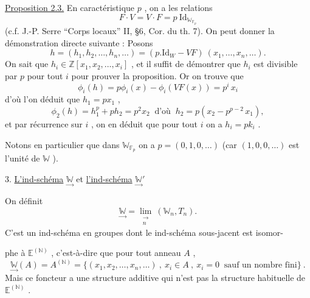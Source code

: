\documentclass[11pt]{article}
\newcommand{\scanpage}[1]{\par\bigskip\noindent{\small\sffamily[scan #1]}\par}
\newcommand{\mspage}[1]{{\small\sffamily[p.\,#1]}}
\newcommand{\uline}[1]{\underline{#1}}
\begin{document}
\clearpage
\scanpage{129/19}
\uline{Proposition 2.3.} En caractéristique $p$ , on a les relations
\[ F\cdot V = V\cdot F = p\ \mathrm{Id}_{\mathbb{W}_{\mathbb{F}_p}} \]
(c.f. J.-P. Serre ``Corps locaux'' II, §6, Cor. du th. 7). On peut donner
la démonstration directe suivante : Posons
\[ h = (h_1,h_2,\dots,h_n,\dots) = (p.\mathrm{Id}_W - VF)\ (x_1,\dots,x_n,\dots) . \]
On sait que $h_i \in \mathbb{Z}[x_1,x_2,\dots,x_i]$ , et il suffit de démontrer que $h_i$
est divisible par $p$ pour tout $i$ pour prouver la proposition. Or on
trouve que
\[ \phi_i(h) = p\phi_i(x) - \phi_i(VF(x)) = p^i\, x_i \]
d'où l'on déduit que $h_1 = px_1$ ,
\[ \phi_2(h) = h_1^p + ph_2 = p^2x_2 \ \text{ d'où }\ h_2 = p(x_2-p^{p-2}\, x_1) , \]
et par récurrence sur $i$ , on en déduit que pour tout $i$ on a $h_i = pk_i$ .

Notons en particulier que dans $\mathbb{W}_{\mathbb{F}_p}$ on a $p = (0,1,0,\dots)$
(car $(1,0,0,\dots)$ est l'unité de $\mathbb{W}$ ).

3. \uline{L'ind-schéma} $\underset{\rightarrow}{\mathbb{W}}$ et \uline{l'ind-schéma} $\underset{\rightarrow}{\mathbb{W}}'$

On définit
\[ \underset{\rightarrow}{\mathbb{W}} = \underset{\substack{\rightarrow\\ n}}{\lim}\ (\mathbb{W}_n,T_n) . \]
C'est un ind-schéma en groupes dont le ind-schéma sous-jacent est isomor-%

\mspage{19}

\clearpage
\scanpage{129/20}
phe à $\mathbb{E}^{(\mathbb{N})}$ , c'est-à-dire que pour tout anneau $A$ ,
\[
\underset{\to}{\mathbb{W}}(A) = A^{(\mathbb{N})} = \{(x_1,x_2,\ldots,x_n,\ldots) \ , \ x_i \in A \ , \ x_i = 0 \ \text{ sauf un nombre fini}\} \ .
\]
Mais ce foncteur a une structure additive qui n'est pas la structure
habituelle de $\mathbb{E}^{(\mathbb{N})}$ .
\end{document}

